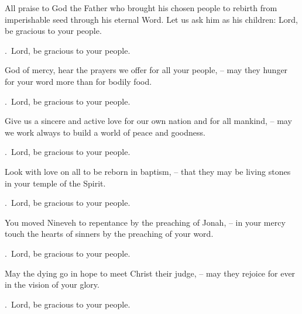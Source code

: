 \lettrine[loversize=0.15,lines=2]{A}{}ll praise to God the Father who brought his chosen people to rebirth from imperishable seed through his eternal Word. Let us ask him as his children: Lord, be gracious to your people.
\par \Rbar.~Lord, be gracious to your people.

God of mercy, hear the prayers we offer for all your people,
– may they hunger for your word more than for bodily food.
\par \Rbar.~Lord, be gracious to your people.

Give us a sincere and active love for our own nation and for all mankind, 
– may we work always to build a world of peace and goodness.
\par \Rbar.~Lord, be gracious to your people.

Look with love on all to be reborn in baptism,
– that they may be living stones in your temple of the Spirit.
\par \Rbar.~Lord, be gracious to your people.

You moved Nineveh to repentance by the preaching of Jonah, 
– in your mercy touch the hearts of sinners by the preaching of your word.
\par \Rbar.~Lord, be gracious to your people.

May the dying go in hope to meet Christ their judge, 
– may they rejoice for ever in the vision of your glory.
\par \Rbar.~Lord, be gracious to your people.
